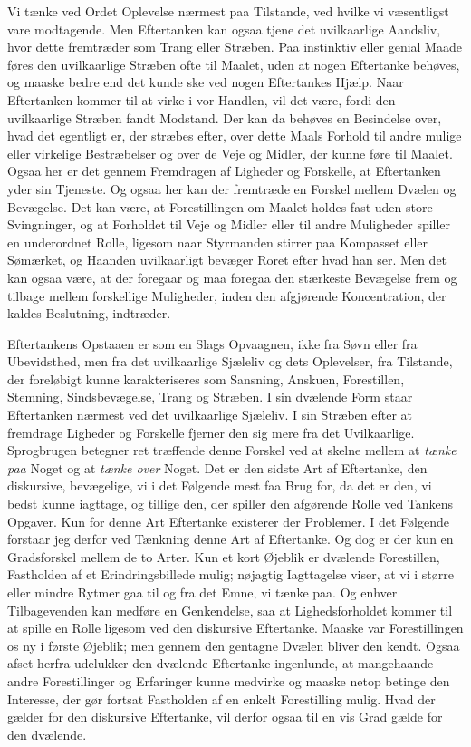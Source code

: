 \documentclass[12pt,a4paper]{book}
\newcommand{\apage}[1]{\marginnote{\footnotesize\textit{[#1]}}}
\begin{document}
Vi tænke ved Ordet Oplevelse nærmest paa Tilstande, ved hvilke vi
væsentligst vare modtagende. Men Eftertanken kan ogsaa tjene det
uvilkaarlige Aandsliv, hvor dette fremtræder som Trang eller Stræben.
Paa instinktiv eller genial Maade føres den uvilkaarlige Stræben ofte
til Maalet, uden at nogen Eftertanke behøves, og maaske bedre end det
kunde ske ved nogen Eftertankes Hjælp. Naar Eftertanken kommer til at
virke i vor Handlen, vil det være, fordi den uvilkaarlige Stræben
fandt Modstand. Der kan da behøves en Besindelse over, hvad det
egentligt er, der stræbes efter, over dette Maals Forhold til andre
mulige eller virkelige Bestræbelser og over de Veje og Midler, der
kunne føre til Maalet. Ogsaa her er det gennem Fremdragen af Ligheder
og Forskelle, at Eftertanken yder sin Tjeneste. Og ogsaa her kan der
fremtræde en Forskel mellem Dvælen og Bevægelse. Det kan være, at
Forestillingen om Maalet holdes fast uden store Svingninger, og at
Forholdet til Veje og Midler eller til andre Muligheder spiller en
underordnet Rolle, ligesom naar Styrmanden stirrer paa Kompasset eller
Sømærket, og Haanden uvilkaarligt bevæger Roret efter hvad han ser.
Men det kan ogsaa være, at der foregaar og maa foregaa den stærkeste
Bevægelse frem og tilbage mellem forskellige Muligheder, inden den
afgjørende Koncentration, der kaldes Beslutning, indtræder.

\apage{3} Eftertankens Opstaaen er som en Slags Opvaagnen, ikke fra Søvn eller
fra Ubevidsthed, men fra det uvilkaarlige Sjæleliv og dets Oplevelser,
fra Tilstande, der foreløbigt kunne karakteriseres som Sansning,
Anskuen, Forestillen, Stemning, Sindsbevægelse, Trang og Stræben. I
sin dvælende Form staar Eftertanken nærmest ved det uvilkaarlige
Sjæleliv. I sin Stræben efter at fremdrage Ligheder og Forskelle
fjerner den sig mere fra det Uvilkaarlige. Sprogbrugen betegner ret
træffende denne Forskel ved at skelne mellem at \emph{tænke paa} Noget
og at \emph{tænke over} Noget. Det er den sidste Art af Eftertanke,
den diskursive, bevægelige, vi i det Følgende mest faa Brug for, da
det er den, vi bedst kunne iagttage, og tillige den, der spiller den
afgørende Rolle ved Tankens Opgaver. Kun for denne Art Eftertanke
existerer der Problemer. I det Følgende forstaar jeg derfor ved
Tænkning denne Art af Eftertanke. Og dog er der kun en Gradsforskel
mellem de to Arter. Kun et kort Øjeblik er dvælende Forestillen,
Fastholden af et Erindringsbillede mulig; nøjagtig Iagttagelse viser,
at vi i større eller mindre Rytmer gaa til og fra det Emne, vi tænke
paa. Og enhver Tilbagevenden kan medføre en Genkendelse, saa at
Lighedsforholdet kommer til at spille en Rolle ligesom ved den
diskursive Eftertanke. Maaske var Forestillingen os ny i første
Øjeblik; men gennem den gentagne Dvælen bliver den kendt. Ogsaa afset
herfra udelukker den dvælende Eftertanke ingenlunde, at mangehaande
andre Forestillinger og Erfaringer kunne medvirke og maaske netop
betinge den Interesse, der gør fortsat Fastholden af en enkelt
Forestilling mulig. Hvad der gælder for den diskursive Eftertanke, vil
derfor ogsaa til en vis Grad gælde for den dvælende.
\end{document}

